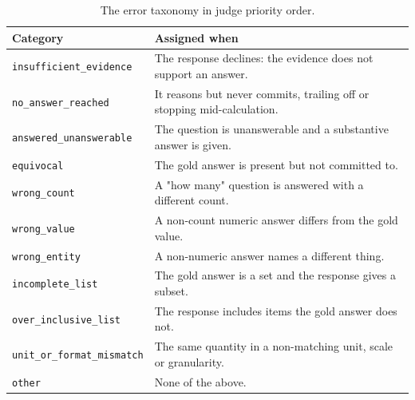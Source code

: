 \begin{table}[h]
\centering
\small
\renewcommand{\arraystretch}{1.15}
\begin{tabular}{@{}ll@{}}
\toprule
\textbf{Category} & \textbf{Assigned when} \\
\midrule
\texttt{insufficient\_evidence} & The response declines: the evidence does not support an answer. \\
\texttt{no\_answer\_reached} & It reasons but never commits, trailing off or stopping mid-calculation. \\
\texttt{answered\_unanswerable} & The question is unanswerable and a substantive answer is given. \\
\texttt{equivocal} & The gold answer is present but not committed to. \\
\texttt{wrong\_count} & A "how many" question is answered with a different count. \\
\texttt{wrong\_value} & A non-count numeric answer differs from the gold value. \\
\texttt{wrong\_entity} & A non-numeric answer names a different thing. \\
\texttt{incomplete\_list} & The gold answer is a set and the response gives a subset. \\
\texttt{over\_inclusive\_list} & The response includes items the gold answer does not. \\
\texttt{unit\_or\_format\_mismatch} & The same quantity in a non-matching unit, scale or granularity. \\
\texttt{other} & None of the above. \\
\bottomrule
\end{tabular}
\caption{The error taxonomy in judge priority order.}
\label{tab:error_taxonomy}
\end{table}